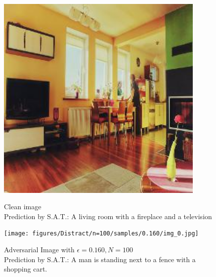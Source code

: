 \begin{figure}[ht]
    \centering
    \begin{minipage}{0.45\textwidth}
        \centering
        \includegraphics[width=0.9\textwidth]{figures/Distract/n=100/samples/0.000/img_0.jpg} %
        \caption*{Clean image\\Prediction by S.A.T.: A living room with a fireplace and a television}
    \end{minipage}\hfill
    \begin{minipage}{0.45\textwidth}
        \centering
        \texttt{[image: figures/Distract/n=100/samples/0.160/img\_0.jpg]} %
        \caption*{Adversarial Image with $\epsilon=0.160, N=100$\\Prediction by S.A.T.: A man is standing next to a fence with a shopping cart.}
    \end{minipage}
\end{figure}

